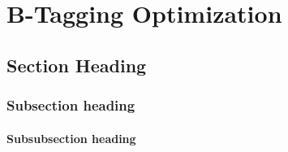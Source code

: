 

\chapter{B-Tagging Optimization}

\section{Section Heading}

\subsection{Subsection heading}

\subsubsection{Subsubsection heading}

